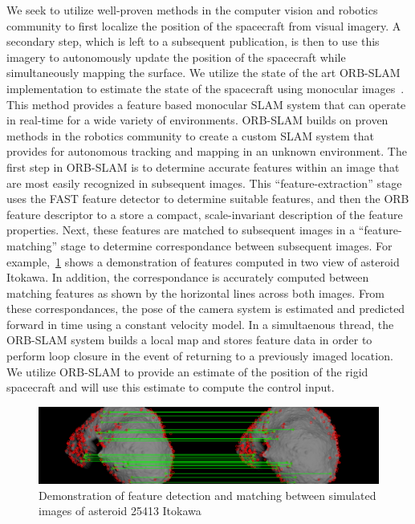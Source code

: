 \documentclass[letterpaper, paper,11pt]{AAS}		%
\begin{document}
We seek to utilize well-proven methods in the computer vision and robotics community to first localize the position of the spacecraft from visual imagery.
A secondary step, which is left to a subsequent publication, is then to use this imagery to autonomously update the position of the spacecraft while simultaneously mapping the surface. 
We utilize the state of the art ORB-SLAM implementation to estimate the state of the spacecraft using monocular images~\cite{mur-artal2015}.
This method provides a feature based monocular SLAM system that can operate in real-time for a wide variety of environments. 
ORB-SLAM builds on proven methods in the robotics community to create a custom SLAM system that provides for autonomous tracking and mapping in an unknown environment. 
The first step in ORB-SLAM is to determine accurate features within an image that are most easily recognized in subsequent images. 
This ``feature-extraction'' stage uses the FAST feature detector to determine suitable features, and then the ORB feature descriptor to a store a compact, scale-invariant description of the feature properties.
Next, these features are matched to subsequent images in a ``feature-matching'' stage to determine correspondance between subsequent images. 
For example,~\cref{fig:itokawa_feature_matching} shows a demonstration of features computed in two view of asteroid Itokawa. 
In addition, the correspondance is accurately computed between matching features as shown by the horizontal lines across both images.
From these correspondances, the pose of the camera system is estimated and predicted forward in time using a constant velocity model.
In a simultaenous thread, the ORB-SLAM system builds a local map and stores feature data in order to perform loop closure in the event of returning to a previously imaged location.
We utilize ORB-SLAM to provide an estimate of the position of the rigid spacecraft and will use this estimate to compute the control input.
\begin{figure}[htbp]
    \centering
    \includegraphics[width=1\textwidth,keepaspectratio]{figures/itokawa_feature_matching.png}
    \caption{Demonstration of feature detection and matching between simulated images of asteroid 25413 Itokawa}
    \label{fig:itokawa_feature_matching}
\end{figure}
\end{document}
